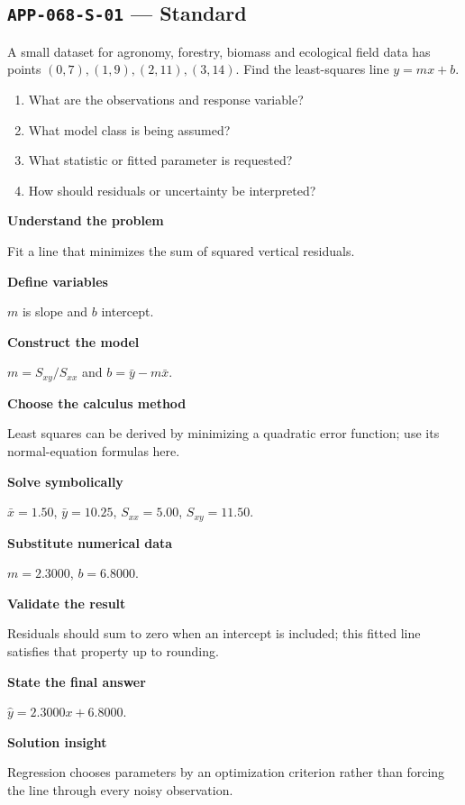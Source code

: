\documentclass[11pt]{book}
\newcommand{\pid}[1]{\texttt{#1}}
\begin{document}
\subsection*{\pid{APP-068-S-01} — Standard}
\begin{problembox}
A small dataset for agronomy, forestry, biomass and ecological field data has points $(0,7),(1,9),(2,11),(3,14)$. Find the least-squares line $y=mx+b$.
\end{problembox}
\begin{promptbox}\begin{enumerate}
\item What are the observations and response variable?
\item What model class is being assumed?
\item What statistic or fitted parameter is requested?
\item How should residuals or uncertainty be interpreted?
\end{enumerate}\end{promptbox}
\begin{solutionbox}
\textbf{Understand the problem}\par Fit a line that minimizes the sum of squared vertical residuals.\par\medskip
\textbf{Define variables}\par $m$ is slope and $b$ intercept.\par\medskip
\textbf{Construct the model}\par $m=S_{xy}/S_{xx}$ and $b=\bar y-m\bar x$.\par\medskip
\textbf{Choose the calculus method}\par Least squares can be derived by minimizing a quadratic error function; use its normal-equation formulas here.\par\medskip
\textbf{Solve symbolically}\par $\bar x=1.50$, $\bar y=10.25$, $S_{xx}=5.00$, $S_{xy}=11.50$.\par\medskip
\textbf{Substitute numerical data}\par $m=2.3000$, $b=6.8000$.\par\medskip
\textbf{Validate the result}\par Residuals should sum to zero when an intercept is included; this fitted line satisfies that property up to rounding.\par\medskip
\textbf{State the final answer}\par $\hat y=2.3000x+6.8000$.\par\medskip
\textbf{Solution insight}\par Regression chooses parameters by an optimization criterion rather than forcing the line through every noisy observation.\par\medskip
\end{solutionbox}
\end{document}
